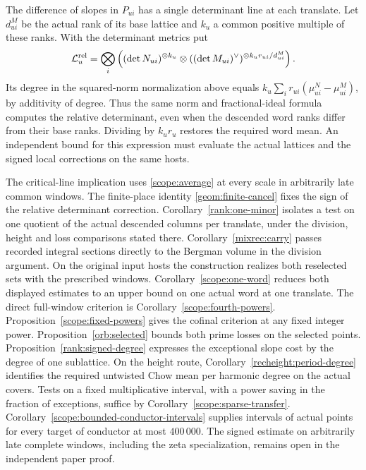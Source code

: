 The difference of slopes in \(P_{ui}\) has a single determinant line
at each translate. Let \(d^M_{ui}\) be the actual rank of its base
lattice and \(k_u\) a common positive multiple of these ranks. With
the determinant metrics put
\[
 \mathcal L_u^{\rm rel}=
 \bigotimes_i\left((\det N_{ui})^{\otimes k_u}\otimes
       ((\det M_{ui})^\vee)^{\otimes k_u r_{ui}/d^M_{ui}}\right).
\]
Its degree in the squared-norm normalization above equals
\(k_u\sum_i r_{ui}(\mu^N_{ui}-\mu^M_{ui})\), by additivity of
degree. Thus the same norm and fractional-ideal formula computes
the relative determinant, even when the descended word ranks differ
from their base ranks. Dividing by \(k_u r_u\) restores the required
word mean. An independent bound for this expression must evaluate
the actual lattices and the signed local corrections on the same hosts.











The critical-line implication uses \eqref{scope:average} at every
scale in arbitrarily late common windows. The finite-place identity
\eqref{geom:finite-cancel} fixes the sign of the relative
determinant correction. Corollary~\ref{rank:one-minor} isolates a
test on one quotient of the actual descended columns per translate,
under the division, height and loss comparisons stated there.
Corollary~\ref{mixrec:carry} passes recorded integral sections
directly to the Bergman volume in the division argument.
On the original input hosts the construction realizes both reselected
sets with the prescribed windows. Corollary~\ref{scope:one-word}
reduces both displayed estimates to an upper bound on one actual
word at one translate. The direct full-window criterion is
Corollary~\ref{scope:fourth-powers}. Proposition~\ref{scope:fixed-powers}
gives the cofinal criterion at any fixed integer power.
Proposition~\ref{orb:selected} bounds both prime losses on the selected
points. Proposition~\ref{rank:signed-degree} expresses the exceptional
slope cost by the degree of one sublattice. On the height route,
Corollary~\ref{recheight:period-degree} identifies the required
untwisted Chow mean per harmonic degree on the actual covers.
Tests on a fixed
multiplicative interval, with a power saving in the fraction of
exceptions, suffice by Corollary~\ref{scope:sparse-transfer}.
Corollary~\ref{scope:bounded-conductor-intervals} supplies intervals
of actual points for every target of conductor at most \(400\,000\).
The signed estimate on arbitrarily late complete windows, including
the zeta specialization, remains open in the independent paper proof.
